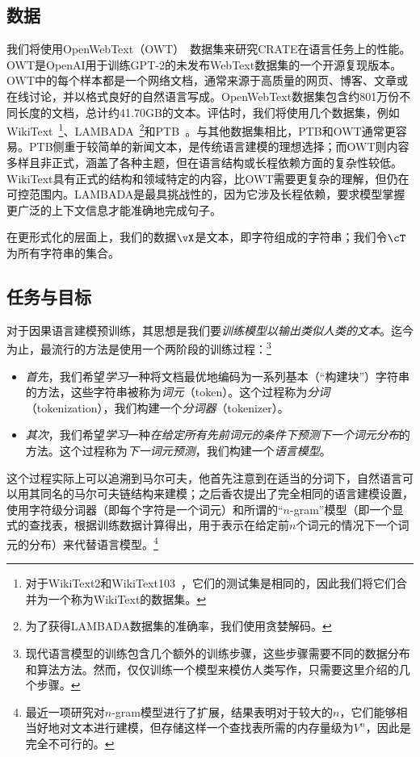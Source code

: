 \documentclass[../../book-main.tex]{subfiles}
\begin{document}
\subsection{数据} \label{sub:clm_text_data}

我们将使用OpenWebText（OWT）~\cite{Gokaslan2019OpenWeb}数据集来研究CRATE在语言任务上的性能。OWT是OpenAI用于训练GPT-2的未发布WebText数据集的一个开源复现版本。OWT中的每个样本都是一个网络文档，通常来源于高质量的网页、博客、文章或在线讨论，并以格式良好的自然语言写成。OpenWebText数据集包含约801万份不同长度的文档，总计约41.70GB的文本。评估时，我们将使用几个数据集，例如WikiText~\cite{merity2016pointer}\footnote{对于WikiText2和WikiText103~\cite{merity2016pointer}，它们的测试集是相同的，因此我们将它们合并为一个称为WikiText的数据集。}、LAMBADA~\cite{paperno2016lambadadatasetwordprediction}\footnote{为了获得LAMBADA数据集的准确率，我们使用贪婪解码。}和PTB~\cite{marcus-etal-1993-building}。与其他数据集相比，PTB和OWT通常更容易。PTB侧重于较简单的新闻文本，是传统语言建模的理想选择；而OWT则内容多样且非正式，涵盖了各种主题，但在语言结构或长程依赖方面的复杂性较低。WikiText具有正式的结构和领域特定的内容，比OWT需要更复杂的理解，但仍在可控范围内。LAMBADA是最具挑战性的，因为它涉及长程依赖，要求模型掌握更广泛的上下文信息才能准确地完成句子。

在更形式化的层面上，我们的数据\(\vX\)是文本，即字符组成的字符串；我们令\(\cT\)为所有字符串的集合。

\subsection{任务与目标} \label{sub:clm_text_objective}

对于因果语言建模预训练，其思想是我们要\textit{训练模型以输出类似人类的文本}。迄今为止，最流行的方法是使用一个两阶段的训练过程：\footnote{现代语言模型的训练包含几个额外的训练步骤，这些步骤需要不同的数据分布和算法方法。然而，仅仅训练一个模型来模仿人类写作，只需要这里介绍的几个步骤。}
\begin{itemize}
    \item \textit{首先}，我们希望\textit{学习}一种将文档最优地编码为一系列基本（“构建块”）字符串的方法，这些字符串被称为\textit{词元}（token）。这个过程称为\textit{分词}（tokenization），我们构建一个\textit{分词器}（tokenizer）。
    \item \textit{其次}，我们希望\textit{学习}一种\textit{在给定所有先前词元的条件下预测下一个词元分布}的方法。这个过程称为\textit{下一词元预测}，我们构建一个\textit{语言模型}。
\end{itemize}
这个过程实际上可以追溯到马尔可夫，他首先注意到在适当的分词下，自然语言可以用其同名的马尔可夫链结构来建模\citep{markov2006example}；之后香农提出了完全相同的语言建模设置，使用字符级分词器（即每个字符是一个词元）和所谓的“\(n\)-gram”模型（即一个显式的查找表，根据训练数据计算得出，用于表示在给定前\(n\)个词元的情况下一个词元的分布）来代替语言模型\citep{Shannon-1948}。\footnote{最近一项研究\citep{liu2024infini}对\(n\)-gram模型进行了扩展，结果表明对于较大的\(n\)，它们能够相当好地对文本进行建模，但存储这样一个查找表所需的内存量级为\(V^{n}\)，因此是完全不可行的。}
\end{document}
